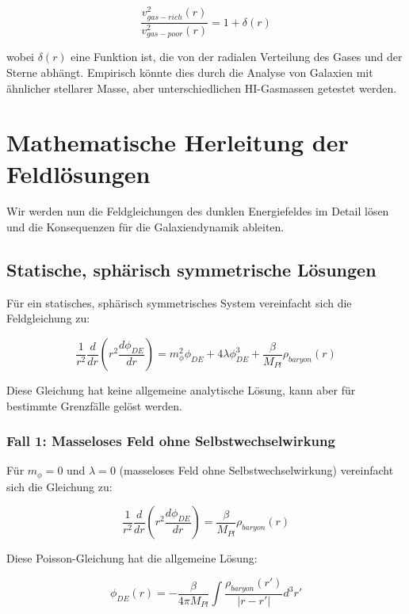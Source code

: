 \documentclass[a4paper,12pt]{article}
\begin{document}
\begin{equation}
	\frac{v^2_{gas-rich}(r)}{v^2_{gas-poor}(r)} = 1 + \delta(r)
\end{equation}

wobei $\delta(r)$ eine Funktion ist, die von der radialen Verteilung des Gases und der Sterne abhängt. Empirisch könnte dies durch die Analyse von Galaxien mit ähnlicher stellarer Masse, aber unterschiedlichen HI-Gasmassen getestet werden.

\section{Mathematische Herleitung der Feldlösungen}

Wir werden nun die Feldgleichungen des dunklen Energiefeldes im Detail lösen und die Konsequenzen für die Galaxiendynamik ableiten.

\subsection{Statische, sphärisch symmetrische Lösungen}

Für ein statisches, sphärisch symmetrisches System vereinfacht sich die Feldgleichung zu:

\begin{equation}
	\frac{1}{r^2}\frac{d}{dr}\left(r^2\frac{d\phi_{DE}}{dr}\right) = m_{\phi}^2\phi_{DE} + 4\lambda\phi_{DE}^3 + \frac{\beta}{M_{Pl}}\rho_{baryon}(r)
\end{equation}

Diese Gleichung hat keine allgemeine analytische Lösung, kann aber für bestimmte Grenzfälle gelöst werden.

\subsubsection{Fall 1: Masseloses Feld ohne Selbstwechselwirkung}

Für $m_{\phi} = 0$ und $\lambda = 0$ (masseloses Feld ohne Selbstwechselwirkung) vereinfacht sich die Gleichung zu:

\begin{equation}
	\frac{1}{r^2}\frac{d}{dr}\left(r^2\frac{d\phi_{DE}}{dr}\right) = \frac{\beta}{M_{Pl}}\rho_{baryon}(r)
\end{equation}

Diese Poisson-Gleichung hat die allgemeine Lösung:

\begin{equation}
	\phi_{DE}(r) = -\frac{\beta}{4\pi M_{Pl}} \int \frac{\rho_{baryon}(r')}{|r-r'|} d^3r'
\end{equation}
\end{document}
